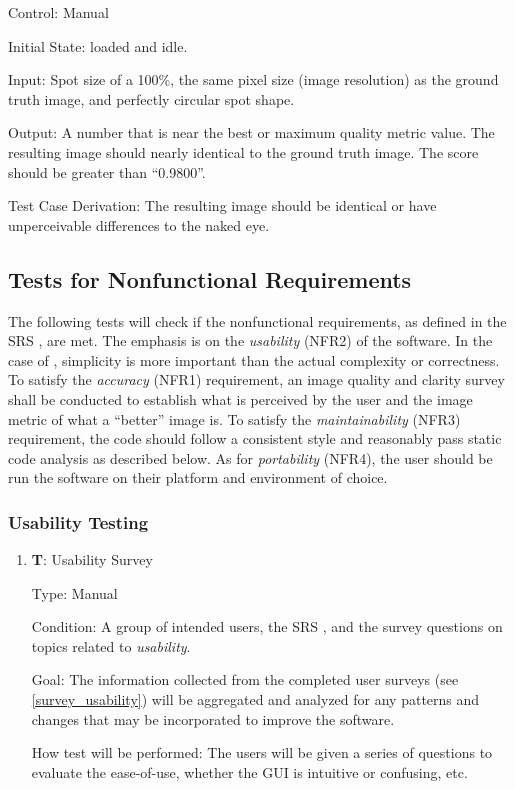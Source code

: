 \documentclass[12pt, titlepage]{article}
\newcounter{testnum} %
\begin{document}
\begin{enumerate}
  Control: Manual
              
  Initial State: \progname{} loaded and idle.
            
  Input: Spot size of a 100\%, the same pixel size (image resolution) as the ground truth image, 
  and perfectly circular spot shape.
            
  Output: A number that is near the best or maximum quality metric value. The resulting image should nearly
  identical to the ground truth image. The score should be greater than ``0.9800''.

  Test Case Derivation: The resulting image should be identical or have unperceivable differences to the naked eye.

\end{enumerate}


\subsection{Tests for Nonfunctional Requirements} \label{sec_NFR_tests}

The following tests will check if the nonfunctional requirements, as defined in the SRS \citep{SRS}, are 
met. The emphasis is on the \textit{usability} (NFR2) of the software. In the case of \progname{}, 
simplicity is more important than the actual complexity or correctness.
To satisfy the \textit{accuracy} (NFR1) requirement, an image quality and clarity survey shall be
conducted to establish what is perceived by the user and the image metric of what 
a ``better'' image is. To satisfy the \textit{maintainability} (NFR3) requirement, the code should 
follow a consistent style and reasonably pass static code analysis as described below.
As for \textit{portability} (NFR4), the user should be run the software on their platform and 
environment of choice.

\subsubsection{Usability Testing}
\begin{enumerate}

  \item{\textbf{T\thetestnum \label{T_surveyUsability}}: Usability Survey\\}

  Type: Manual
            
  Condition: A group of intended users, the SRS \citep{SRS}, and 
  the survey questions on topics related to \textit{usability}.
            
  Goal: The information collected from the completed user surveys (see \ref{survey_usability})
    will be aggregated and analyzed for any patterns and changes
    that may be incorporated to improve the software.
            
  How test will be performed: The users will be given a series of questions to evaluate the 
    ease-of-use, whether the GUI is intuitive or confusing, etc.

\end{enumerate}
\end{document}
